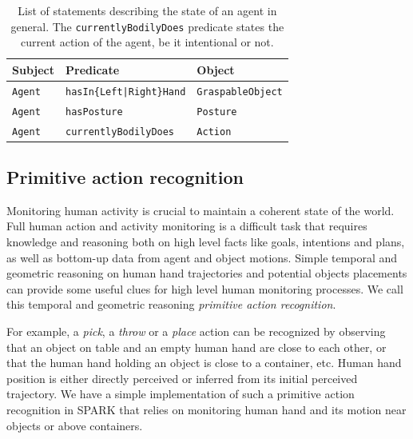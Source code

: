 \documentclass{svmult}
\newcommand{\concept}[1]{{\footnotesize \texttt{#1}}}
\begin{document}
\begin{table}[h]
	\centering
	\begin{tabular}{p{2cm}p{5cm}p{2cm}}
		\textbf{Subject} & \textbf{Predicate} & \textbf{Object} \\
		\hline
		\concept{Agent} & \concept{hasIn\{Left|Right\}Hand}  &  \concept{GraspableObject} \\ 
		\concept{Agent} & \concept{hasPosture}  &  \concept{Posture} \\
		\concept{Agent} & \concept{currentlyBodilyDoes}  &  \concept{Action}
	\end{tabular}
	\caption{List of statements describing the state of an agent in general. The \concept{currentlyBodilyDoes} predicate states the current action of the agent, be it intentional or not.}
\end{table}



\subsection{Primitive action recognition}
\label{sec|primitives}

Monitoring human activity is crucial to maintain a coherent state of the world.
Full human action and activity monitoring is a difficult task that requires
knowledge and reasoning both on high level facts like goals, intentions and
plans, as well as bottom-up data from agent and object motions. Simple temporal
and geometric reasoning on human hand trajectories and potential objects
placements can provide some useful clues for high level human monitoring
processes. We call this temporal and geometric reasoning \emph{primitive action
recognition}.

For example, a \emph{pick}, a \emph{throw} or a \emph{place} action can be
recognized by observing that an object on table and an empty human hand are
close to each other, or that the human hand holding an object is close to a
container, etc. Human hand position is either directly perceived or inferred
from its initial perceived trajectory.  We have a simple implementation of such
a primitive action recognition in SPARK that relies on monitoring human hand
and its motion near objects or above containers.
\end{document}
